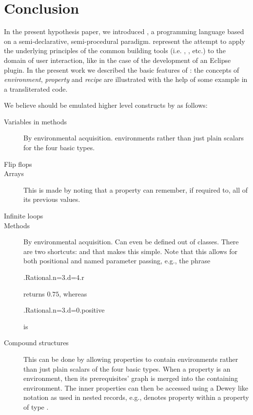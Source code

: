 \section{Conclusion}

In the present hypothesis paper, we introduced \Reap, a programming language 
based on a semi-declarative, semi-procedural paradigm. 
\Reap represent the attempt to apply the underlying principles of 
the common building tools (i.e. , , etc.) to the domain 
of user interaction, like in the case of the development of an Eclipse plugin.
In the present work we described the basic features of \Reap: the concepts
of \emph{environment}, \emph{property} and \emph{recipe} are illustrated
with the help of some example in a transliterated \Java code.

We believe \Reap should be emulated higher level constructs by as follows:
\begin{description}
  \item[Variables in methods] By environmental acquisition. 
    environments rather than just plain scalars for the four basic types.
  \item [Flip flops] 
  \item [Arrays] This is made by noting that a property can remember, if
    required to, all of its previous values.
  \item [Infinite loops]
  \item[Methods] By environmental acquisition. Can even be defined out of 
    classes. There are two shortcuts: \cc{\$} and \cc{\_} that makes this
    simple. Note that this allows for both positional and named parameter
    passing, e.g., the phrase
\begin{reap}
.Rational.n=3.d=4.r  
\end{reap}
returns $0.75$, whereas 
\begin{reap}
.Rational.n=3.d=0.positive  
\end{reap}
is 

  \item[Compound structures] This can be done by allowing properties to contain
    environments rather than just plain scalars of the four basic types. When a
    property is an environment, then its prerequisites' graph is merged into
    the containing environment. The inner properties can then be accessed using
    a Dewey like notation as used in nested records, e.g., 
    denotes property  within a property of type .

\end{description}

